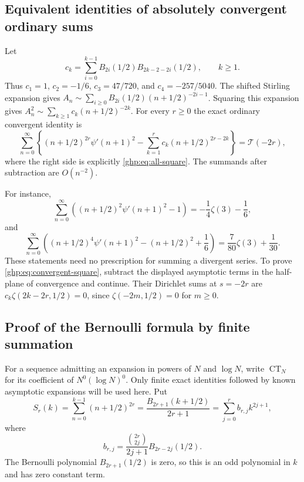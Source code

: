 \subsection{Equivalent identities of absolutely convergent ordinary sums}

Let
\begin{equation}\label{ghp:def:ck}
 c_k=\sum_{i=0}^{k-1}B_{2i}(1/2)B_{2k-2-2i}(1/2),\qquad k\geq1.
\end{equation}
Thus $c_1=1$, $c_2=-1/6$, $c_3=47/720$, and
$c_4=-257/5040$. The shifted Stirling expansion gives $A_n\sim\sum_{i\ge0} B_{2i}(1/2)(n+1/2)^{-2i-1}$. Squaring this expansion gives
$A_n^2\sim\sum_{k\geq1}c_k(n+1/2)^{-2k}$.
For every $r\geq0$ the exact ordinary convergent identity is
\begin{equation}\label{ghp:eq:convergent-square}
 \sum_{n=0}^{\infty}\left\{(n+1/2)^{2r}\psi'(n+1)^2
       -\sum_{k=1}^r c_k(n+1/2)^{2r-2k}\right\}
       =\mathcal T(-2r),
\end{equation}
where the right side is explicitly \eqref{ghp:eq:all-square}. The
summands after subtraction are $O(n^{-2})$.

For instance,
\[
 \sum_{n=0}^{\infty}\left((n+1/2)^2\psi'(n+1)^2-1\right)
       =-\frac14\zeta(3)-\frac16,
\]
and
\[
 \sum_{n=0}^{\infty}\left((n+1/2)^4\psi'(n+1)^2
                         -(n+1/2)^2+\frac16\right)
       =\frac7{80}\zeta(3)+\frac1{30}.
\]
These statements need no prescription for summing a divergent series.
To prove \eqref{ghp:eq:convergent-square}, subtract the displayed
asymptotic terms in the half-plane of convergence and continue. Their
Dirichlet sums at $s=-2r$ are
$c_k\zeta(2k-2r,1/2)=0$, since
$\zeta(-2m,1/2)=0$ for $m\geq0$.

\subsection{Proof of the Bernoulli formula by finite summation}

For a sequence admitting an expansion in powers of $N$ and $\log N$,
write $\operatorname{CT}_N$ for its coefficient of $N^0(\log N)^0$.
Only finite exact identities followed by known asymptotic expansions
will be used here. Put
\begin{equation}\label{ghp:def:S}
 S_r(k)=\sum_{n=0}^{k-1}(n+1/2)^{2r}
  =\frac{B_{2r+1}(k+1/2)}{2r+1}
  =\sum_{j=0}^r b_{r,j}k^{2j+1},
\end{equation}
where
\begin{equation}\label{ghp:def:b}
 b_{r,j}=\frac{\binom{2r}{2j}}{2j+1}B_{2r-2j}(1/2).
\end{equation}
The Bernoulli polynomial $B_{2r+1}(1/2)$ is zero, so this is an odd
polynomial in $k$ and has zero constant term.

